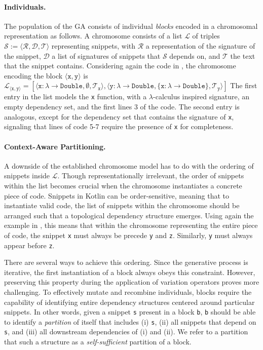 \paragraph{Individuals.} The population of the \gls{GA} consists
of individual \textit{blocks} encoded in a chromosomal representation as follows.
A chromosome consists of a list $\mathcal{L}$ of triples
$\mathcal{S} := \langle \mathcal{R}, \mathcal{D}, \mathcal{T} \rangle$ representing snippets,
with $\mathcal{R}$ a representation of the signature of the snippet,
$\mathcal{D}$ a list of signatures of snippets that $\mathcal{S}$ depends on,
and $\mathcal{T}$ the text that the snippet contains.
Considering again the code in ,
the chromosome encoding the block $\langle \texttt{x}, \texttt{y} \rangle$
is $\mathcal{L}_{\langle \texttt{x}, \texttt{y} \rangle} =
[ \langle
\texttt{x} : \lambda \to \texttt{Double}, \emptyset, \mathcal{T}_{\texttt{x}}\rangle,
\langle \texttt{y} : \lambda \to \texttt{Double},
\{ \texttt{x} : \lambda \to \texttt{Double} \}, \mathcal{T}_{\texttt{y}} \rangle ]$
The first entry in the list models the \texttt{x} function, with a
$\lambda$-calculus inspired signature, an empty dependency set, and
the first lines 3 of the code.
The second entry is analogous, except for the dependency set 
that contains the signature of \texttt{x}, signaling that
lines of code 5-7 require the presence of \texttt{x} for completeness.

\paragraph{Context-Aware Partitioning.} A downside of the
established chromosome model has to do with the ordering of
snippets inside $\mathcal{L}$.
Though representationally irrelevant, the order of snippets within
the list becomes crucial when the chromosome instantiates
a concrete piece of code.
Snippets in Kotlin can be order-sensitive, meaning that to
instantiate valid code, the list of snippets within the chromosome
should be arranged such that a topological dependency structure
emerges.
Using again the example in , this means
that within the chromosome representing the entire piece of code,
the snippet \texttt{x} must always be precede \texttt{y} and \texttt{z}.
Similarly, \texttt{y} must always appear before \texttt{z}.

There are several ways to achieve this ordering.
Since the generative process is iterative, the first instantiation
of a block always obeys this constraint.
However, preserving this property during the application of
variation operators proves more challenging.
To effectively mutate and recombine individuals,
blocks require the capability of
identifying entire dependency structures centered around particular snippets.
In other words, given a snippet \texttt{s} present in a block
\texttt{b}, \texttt{b} should be able to  identify a \textit{partition}
of itself that includes (i) \texttt{s}, (ii) all snippets
that depend on \texttt{s}, and (iii) all downstream dependencies of (i) and (ii).
We refer to a partition that such a structure as a \textit{self-sufficient} partition
of a block.

